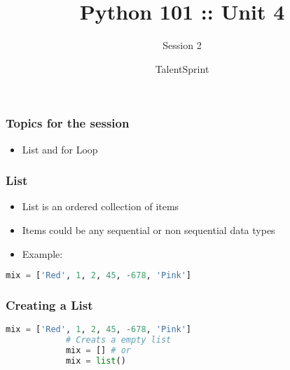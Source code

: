 \documentclass[14pt]{beamer}
\title{Python 101 :: Unit 4}
\subtitle{Session 2}
\date{}
\author[TS]{TalentSprint}
\begin{document}
    \begin{frame}
        \titlepage
    \end{frame}
    \begin{frame}
        \frametitle{Topics for the session}
        \begin{itemize}
            \item List and for Loop
        \end{itemize}
    \end{frame}

    \begin{frame}[containsverbatim]
       \frametitle{List}
       \begin{itemize}
        \item List is an ordered collection of items
        \item Items could be any sequential or non sequential data types
        \item \alert{Example:}
       \end{itemize}
       \begin{lstlisting}[language=Python]
        mix = ['Red', 1, 2, 45, -678, 'Pink'] 
       \end{lstlisting}
    \end{frame}

    \begin{frame}[containsverbatim]
        \frametitle{Creating a List}
        \begin{lstlisting}[language=Python]
            mix = ['Red', 1, 2, 45, -678, 'Pink']
            # Creats a empty list
            mix = [] # or
            mix = list()
        \end{lstlisting}
    \end{frame}
\end{document}
